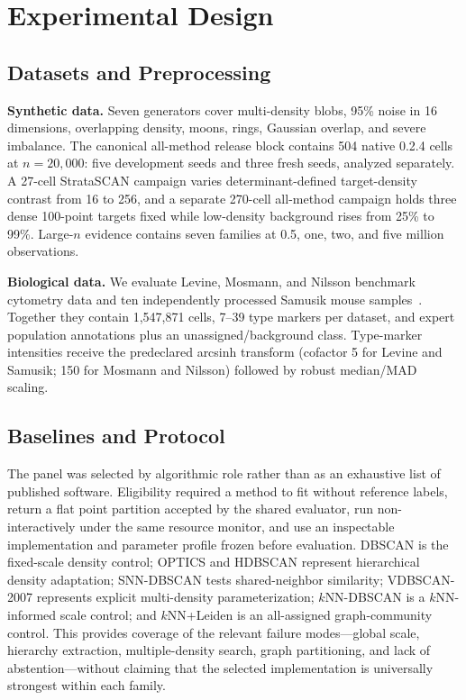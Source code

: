 \documentclass[conference]{IEEEtran}
\begin{document}
\section{Experimental Design}
\subsection{Datasets and Preprocessing}
\textbf{Synthetic data.} Seven generators cover multi-density blobs, 95\% noise in 16 dimensions, overlapping density, moons, rings, Gaussian overlap, and severe imbalance. The canonical all-method release block contains 504 native 0.2.4 cells at $n=20{,}000$: five development seeds and three fresh seeds, analyzed separately. A 27-cell StrataSCAN campaign varies determinant-defined target-density contrast from 16 to 256, and a separate 270-cell all-method campaign holds three dense 100-point targets fixed while low-density background rises from 25\% to 99\%. Large-$n$ evidence contains seven families at 0.5, one, two, and five million observations.

\textbf{Biological data.} We evaluate Levine, Mosmann, and Nilsson benchmark cytometry data and ten independently processed Samusik mouse samples~\cite{levine2015aml,samusik2016phenotype,weber2016cytometry}. Together they contain 1,547,871 cells, 7--39 type markers per dataset, and expert population annotations plus an unassigned/background class. Type-marker intensities receive the predeclared arcsinh transform (cofactor 5 for Levine and Samusik; 150 for Mosmann and Nilsson) followed by robust median/MAD scaling.


\subsection{Baselines and Protocol}
The panel was selected by algorithmic role rather than as an exhaustive list of published software. Eligibility required a method to fit without reference labels, return a flat point partition accepted by the shared evaluator, run non-interactively under the same resource monitor, and use an inspectable implementation and parameter profile frozen before evaluation. DBSCAN is the fixed-scale density control; OPTICS and HDBSCAN represent hierarchical density adaptation; SNN-DBSCAN tests shared-neighbor similarity; VDBSCAN-2007 represents explicit multi-density parameterization; $k$NN-DBSCAN is a $k$NN-informed scale control; and $k$NN+Leiden is an all-assigned graph-community control. This provides coverage of the relevant failure modes---global scale, hierarchy extraction, multiple-density search, graph partitioning, and lack of abstention---without claiming that the selected implementation is universally strongest within each family.
\end{document}
